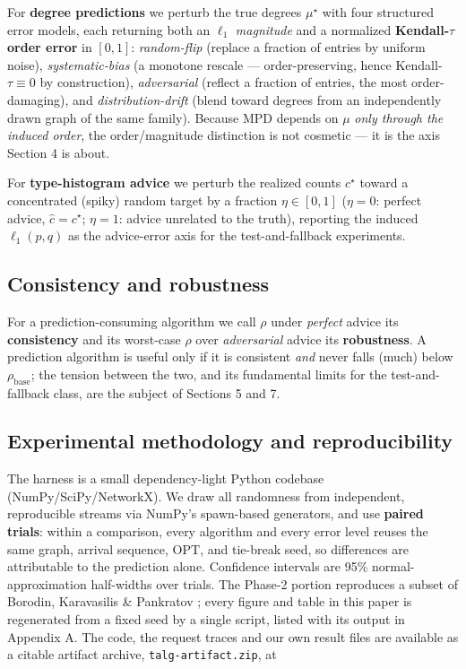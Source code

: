 For \textbf{degree predictions} we perturb the true degrees
\(\mu^\star\) with four structured error models, each returning both an
\(\ell_1\) \emph{magnitude} and a normalized \textbf{Kendall-\(\tau\)
order error} in \([0,1]\): \emph{random-flip} (replace a fraction of
entries by uniform noise), \emph{systematic-bias} (a monotone rescale
--- order-preserving, hence Kendall-\(\tau\equiv 0\) by construction),
\emph{adversarial} (reflect a fraction of entries, the most
order-damaging), and \emph{distribution-drift} (blend toward degrees
from an independently drawn graph of the same family). Because MPD
depends on \(\mu\) \emph{only through the induced order}, the
order/magnitude distinction is not cosmetic --- it is the axis Section 4
is about.

For \textbf{type-histogram advice} we perturb the realized counts
\(c^\star\) toward a concentrated (spiky) random target by a fraction
\(\eta\in[0,1]\) (\(\eta=0\): perfect advice, \(\hat c=c^\star\);
\(\eta=1\): advice unrelated to the truth), reporting the induced
\(\ell_1(p,q)\) as the advice-error axis for the test-and-fallback
experiments.

\subsection{Consistency and
robustness}

For a prediction-consuming algorithm we call \(\rho\) under
\emph{perfect} advice its \textbf{consistency} and its worst-case
\(\rho\) over \emph{adversarial} advice its \textbf{robustness}. A
prediction algorithm is useful only if it is consistent \emph{and} never
falls (much) below \(\rho_{\mathrm{base}}\); the tension between the
two, and its fundamental limits for the test-and-fallback class, are the
subject of Sections 5 and 7.

\subsection{Experimental methodology and
reproducibility}

The harness is a small dependency-light Python codebase
(NumPy/SciPy/NetworkX). We draw all randomness from independent,
reproducible streams via NumPy's spawn-based generators, and use
\textbf{paired trials}: within a comparison, every algorithm and every
error level reuses the same graph, arrival sequence, \(\mathrm{OPT}\),
and tie-break seed, so differences are attributable to the prediction
alone. Confidence intervals are 95\% normal-approximation half-widths
over trials. The Phase-2 portion reproduces a subset of Borodin,
Karavasilis \& Pankratov \cite{borodin2018experimental}; every figure
and table in this paper is regenerated from a fixed seed by a single
script, listed with its output in Appendix A. The code, the request
traces and our own result files are available as a citable artifact
archive, \texttt{talg-artifact.zip}, at

